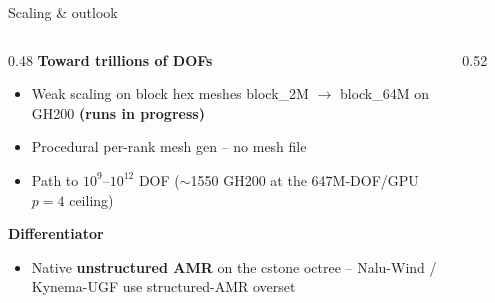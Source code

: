 \documentclass[aspectratio=43,11pt]{beamer}
\newcommand{\subhead}[1]{{\color{marsdark}\bfseries #1}\par\vspace{0.2em}}
\begin{document}
\begin{frame}{Scaling \& outlook}
  \begin{columns}[T]
    \begin{column}{0.48\textwidth}
      \subhead{Toward trillions of DOFs}
      \begin{itemize}
        \item Weak scaling on block hex meshes block\_2M $\to$ block\_64M
              on GH200 \textcolor{marsorange}{\textbf{(runs in progress)}}
        \item Procedural per-rank mesh gen -- no mesh file
        \item Path to $10^{9}$--$10^{12}$ DOF
              ($\sim$1550 GH200 at the 647M-DOF/GPU $p{=}4$ ceiling)
      \end{itemize}
      \subhead{Differentiator}
      \begin{itemize}
        \item Native \textbf{unstructured AMR} on the cstone octree --
              Nalu-Wind / Kynema-UGF use structured-AMR overset
      \end{itemize}
    \end{column}
    \begin{column}{0.52\textwidth}
      \begin{figure}
      \vspace{0.4em}
      \begin{tikzpicture}

\end{tikzpicture}
\end{figure}
\end{column}
\end{columns}
\end{frame}
\end{document}
